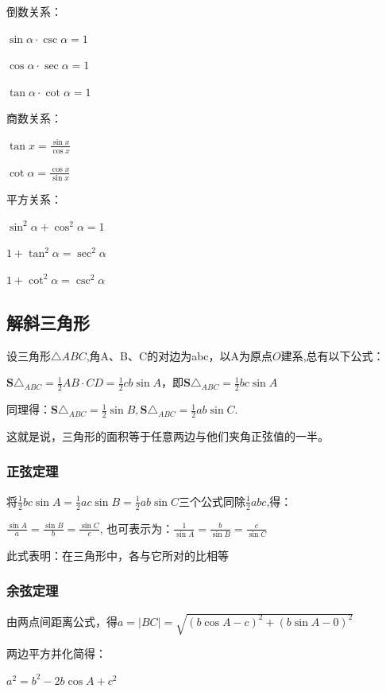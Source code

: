 \documentclass[UTF8]{ctexbook}
\begin{document}
{{{  倒数关系：

  $\sin\alpha \cdot \csc\alpha = 1$

  $\cos\alpha \cdot \sec\alpha = 1$

  $\tan\alpha \cdot \cot\alpha = 1$

  商数关系：

  $\tan{x} = \frac{\sin{x}}{\cos{x}}$

  $\cot\alpha = \frac{\cos x}{\sin x}$

  平方关系：

  $\sin^2\alpha + \cos^2\alpha = 1$

  $1 + \tan^2\alpha = \sec^2\alpha$

  $1 + \cot^2\alpha = \csc^2\alpha$

}%

\subsection{解斜三角形}{
设三角形$\triangle ABC$,角A、B、C的对边为abc，以A为原点$O$建系,总有以下公式：

$\mathbf{S}\triangle_{ABC} = \frac{1}{2}AB \cdot CD = \frac{1}{2}cb\sin A$，即$\mathbf{S}\triangle_{ABC} = \frac{1}{2}bc\sin A$

同理得：$\mathbf{S}\triangle_{ABC} = \frac{1}{2}\sin B, \mathbf{S}\triangle_{ABC} = \frac{1}{2}ab\sin C$.

这就是说，三角形的面积等于任意两边与他们夹角正弦值的一半。

\subsubsection{正弦定理}
将$\frac{1}{2}bc\sin A = \frac{1}{2}ac\sin B = \frac{1}{2}ab\sin C$三个公式同除$\frac{1}{2}abc$,得：

$\frac{\sin A}{a} = \frac{\sin B}{b} = \frac{\sin C}{c}$, 也可表示为：$\frac{1}{\sin A} = \frac{b}{\sin B} = \frac{c}{\sin C}$

此式表明：在三角形中，各{}与它所对{}的比相等
}%

\subsubsection{余弦定理}{
  由两点间距离公式，得$a = |BC| = \sqrt{(b\cos A - c)^2 + (b\sin A - 0)^2}$

  两边平方并化简得：

  $a^2 = b^2 - 2b\cos A + c^2$

}}}
\end{document}
